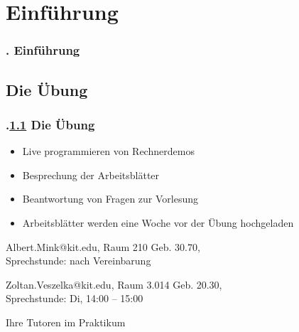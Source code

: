 \section{Einführung}
\begin{frame}
  \frametitle{\kap. Einführung}%
\tableofcontents[current]
\end{frame}


\def\stitle{Die Übung}%
\subsection{\stitle}\label{S:Uebersicht}
\begin{frame}[fragile]%
  \frametitle{\kap.\ref{S:Uebersicht} \stitle}%

\begin{itemize}
  \item Live programmieren von Rechnerdemos
  \item Besprechung der Arbeitsblätter
  \item Beantwortung von Fragen zur Vorlesung
  \item Arbeitsblätter werden eine Woche vor der Übung hochgeladen
\end{itemize}
\hfill

\begin{description}[leftmargin=*,style=nextline]
  \item[\textcolor{black}{\textbf{Ansprechpartner}}]
  \item[Übung] Albert.Mink@kit.edu, Raum 210 Geb. 30.70,\\ Sprechstunde: nach Vereinbarung
  \item[Übung und Praktikum] Zoltan.Veszelka@kit.edu, Raum 3.014 Geb. 20.30,\\ Sprechstunde: Di, 14:00 -- 15:00
  \item[Praktikum] Ihre Tutoren im Praktikum
\end{description}
\end{frame}


\def\stitle{Bearbeitung der Praktikumsaufgaben}%
